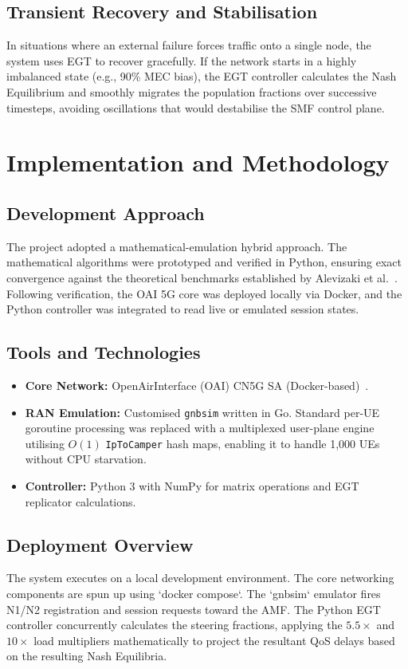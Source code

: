\documentclass[11pt,a4paper,english]{article}
\begin{document}
\subsection{Transient Recovery and Stabilisation}
In situations where an external failure forces traffic onto a single node, the system uses EGT to recover gracefully. If the network starts in a highly imbalanced state (e.g., 90\% MEC bias), the EGT controller calculates the Nash Equilibrium and smoothly migrates the population fractions over successive timesteps, avoiding oscillations that would destabilise the SMF control plane.

\newpage

\section{Implementation and Methodology}
\subsection{Development Approach}
The project adopted a mathematical-emulation hybrid approach. The mathematical algorithms were prototyped and verified in Python, ensuring exact convergence against the theoretical benchmarks established by Alevizaki et al.~\cite{Alevizaki2021upf}. Following verification, the OAI 5G core was deployed locally via Docker, and the Python controller was integrated to read live or emulated session states.

\subsection{Tools and Technologies}
\begin{itemize}
    \item \textbf{Core Network:} OpenAirInterface (OAI) CN5G SA (Docker-based)~\cite{oai_cn5g}.
    \item \textbf{RAN Emulation:} Customised \texttt{gnbsim} written in Go. Standard per-UE goroutine processing was replaced with a multiplexed user-plane engine utilising $O(1)$ \texttt{IpToCamper} hash maps, enabling it to handle 1,000 UEs without CPU starvation.
    \item \textbf{Controller:} Python 3 with NumPy for matrix operations and EGT replicator calculations.
\end{itemize}

\subsection{Deployment Overview}
The system executes on a local development environment. The core networking components are spun up using `docker compose`. The `gnbsim` emulator fires N1/N2 registration and session requests toward the AMF. The Python EGT controller concurrently calculates the steering fractions, applying the $5.5\times$ and $10\times$ load multipliers mathematically to project the resultant QoS delays based on the resulting Nash Equilibria.
\end{document}
